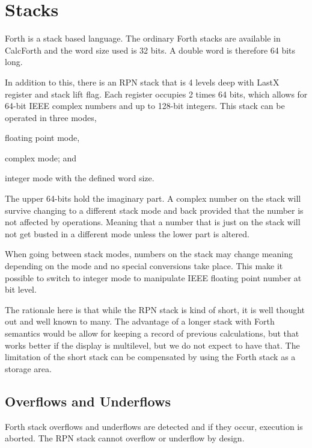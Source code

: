 \documentclass[a4paper]{article}
\begin{document}
\section{Stacks}
Forth is a stack based language. The ordinary Forth stacks are available in CalcForth and the word size used is 32 bits. A double word is therefore 64 bits long.

In addition to this, there is an RPN stack that is 4 levels deep with LastX register and stack lift flag.
Each register occupies 2 times 64 bits, which allows for 64-bit IEEE complex numbers and up to 128-bit integers.
This stack can be operated in three modes,
\begin{inparaenum}
\item  floating point mode,
\item complex mode; and
\item integer mode with the defined word size.
\end{inparaenum}

The upper 64-bits hold the imaginary part. A complex number on the stack will survive changing to a different stack mode and back provided that the number is not affected by operations. Meaning that a number that is just on the stack will not get busted in a different mode unless the lower part is altered.

When going between stack modes, numbers on the stack may change meaning depending on the mode and no special conversions take place. This make it possible to switch to integer mode to manipulate IEEE floating point number at bit level.

The rationale here is that while the RPN stack is kind of short, it is well thought out and well known to many. The advantage of a longer stack with Forth semantics would be allow for keeping a record of previous calculations, but that works better if the display is multilevel, but we do not expect to have that. The limitation of the short stack can be compensated by using the Forth stack as a storage area.

\subsection{Overflows and Underflows}
Forth stack overflows and underflows are detected and if they occur, execution is aborted.  The RPN stack cannot overflow or underflow by design.
\end{document}
